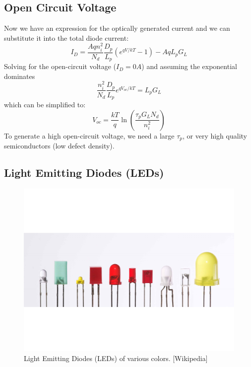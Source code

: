 \subsection{Open Circuit Voltage}
Now we have an expression for the optically generated current and we can substitute it into the total diode current:
\begin{equation} 
	I_D = \frac{A q n_i^2}{N_d} \frac{D_p}{L_p}  (e^{qV/kT} - 1) - A q L_p G_L 
\end{equation}
Solving for the open-circuit voltage ($I_D = 0A$) and assuming the exponential dominates
\begin{equation} 
	 \frac{  n_i^2}{N_d} \frac{D_p}{L_p}  e^{qV_{oc} /kT}  =  L_p G_L 
\end{equation}
which can be simplified to:
\begin{equation} 
	 V_{oc} = \frac{kT}{q} \ln \left( \frac{\tau_p G_L N_d}{n_i^2} \right) 
\end{equation}
To generate a high open-circuit voltage, we need a large $\tau_p$, or very high quality semiconductors (low defect density).
\subsection{Light Emitting Diodes (LEDs)}
\begin{figure}[tb]
\begin{center}
\includegraphics[width=.75\columnwidth]{led}
\end{center}
\caption{Light Emitting Diodes (LEDs) of various colors. [Wikipedia]}
\label{fig:led}
\end{figure}

